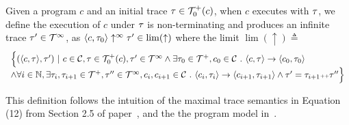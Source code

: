 \begin{defn}
  \label{def:non-terminating}
  Given a program $c$ and an initial trace $\mathtt{\tau} \in \mathcal{T}^{+}_0(c)$,
  when $c$ executes with $\mathtt{\tau}$,  we define the execution of $c$ under $\mathtt{\tau}$ is non-terminating and produces an infinite trace $\mathtt{\tau}' \in \mathcal{T}^{\infty}$, as 
  $\langle c, \mathtt{\tau}_0 \rangle \uparrow^{\infty} \mathtt{\tau}' \in \lim(\uparrow)$
  where the limit $\lim(\uparrow) \triangleq $
{\small 
\[
  \begin{array}{l}
  \Big\{
    (\langle c, \mathtt{\tau} \rangle, \mathtt{\tau}') ~\vert~ 
    c\in \mathcal{C}, \mathtt{\tau} \in \mathcal{T}^{+}_0(c),
    \mathtt{\tau}' \in \mathcal{T}^{\infty} 
    \land \exists \mathtt{\tau}_0 \in \mathcal{T}^{+}, c_0 \in \mathcal{C} ~.~ 
    \langle c, \mathtt{\tau} \rangle \to \langle c_0, \mathtt{\tau}_0 \rangle
    \\ 
    \land \forall i \in \mathbb{N}, \exists \mathtt{\tau}_i, \mathtt{\tau}_{i + 1} \in \mathcal{T}^{+}, \mathtt{\tau}'' \in \mathcal{T}^{\infty}, c_i, c_{i + 1} \in \mathcal{C} ~.~ 
    \langle c_i, \mathtt{\tau}_i \rangle \to \langle c_{i + 1}, \mathtt{\tau}_{i + 1} \rangle 
    \land  \mathtt{\tau}' = \mathtt{\tau}_{i + 1} {\scriptscriptstyle ++} \mathtt{\tau}''
  \Big\}
  \end{array}
\]
}
\end{defn}
This definition follows the intuition of the maximal trace semantics in Equation (12) from Section 2.5 of paper~\cite{Cousot19a}, and the the program model in~\cite{SinnZV17}.

